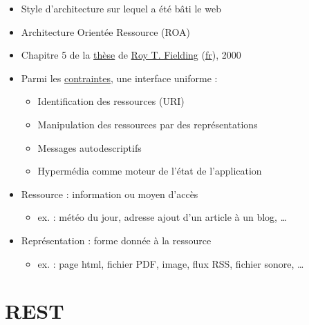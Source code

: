 \begin{itemize}
\tightlist
\item
  Style d'architecture sur lequel a été bâti le web
\item
  Architecture Orientée Ressource (ROA)
\item
  Chapitre 5 de la
  \href{http://www.ics.uci.edu/~fielding/pubs/dissertation/top.htm}{thèse}
  de \href{https://fr.wikipedia.org/wiki/Roy_Fielding}{Roy T. Fielding}
  (\href{http://opikanoba.org/tr/fielding/rest/}{fr}), 2000
\item
  Parmi les
  \href{https://fr.wikipedia.org/wiki/Representational_state_transfer}{contraintes},
  une interface uniforme :

  \begin{itemize}
  \tightlist
  \item
    Identification des ressources (URI)
  \item
    Manipulation des ressources par des représentations
  \item
    Messages autodescriptifs
  \item
    Hypermédia comme moteur de l'état de l'application
  \end{itemize}
\item
  Ressource : information ou moyen d'accès

  \begin{itemize}
  \tightlist
  \item
    ex. : météo du jour, adresse ajout d'un article à un blog, \ldots{}
  \end{itemize}
\item
  Représentation : forme donnée à la ressource

  \begin{itemize}
  \tightlist
  \item
    ex. : page html, fichier PDF, image, flux RSS, fichier sonore,
    \ldots{}
  \end{itemize}
\end{itemize}

\hypertarget{rest}{%
\section{REST}\label{rest}}

